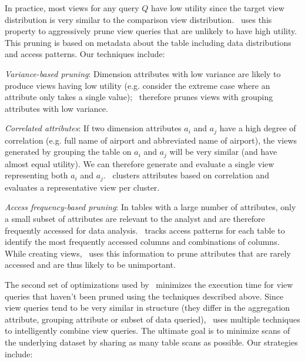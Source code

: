 
In practice, most views for any query $Q$ have low utility since the target view
distribution is very similar to the comparison view distribution. 
\VizRecDB\ uses this property to aggressively prune 
view queries that are unlikely to have high utility. 
This pruning is based on metadata about the table including data
distributions and access patterns. Our techniques include:
\begin{denselist}
\item {\it Variance-based pruning}: Dimension attributes with low variance are
likely to produce views having low utility (e.g. consider the extreme case where
an attribute only takes a single value); \VizRecDB\ therefore prunes views
with grouping attributes with low variance.
\item {\it Correlated attributes}: If two dimension attributes $a_i$ and $a_j$ have
a high degree of correlation (e.g. full name of airport and abbreviated name of
airport), the views generated by grouping the table on $a_i$ and $a_j$ will be
very similar (and have almost equal utility). We can therefore generate and
evaluate a single view representing both $a_i$ and $a_j$. \VizRecDB\ clusters
attributes based on correlation and evaluates a representative view per
cluster.
\item {\it Access frequency-based pruning}: In tables with a large number of
attributes, only a small subset of attributes are relevant to the analyst and
are therefore frequently accessed for data analysis. \VizRecDB\ tracks access patterns
for each table to identify the most frequently accessed columns and combinations of
columns. While creating views, \VizRecDB\ uses this information to prune attributes
that are rarely accessed and are thus likely to be unimportant.
\end{denselist}

The second set of optimizations used by \VizRecDB\ minimizes the execution time for
view queries that haven't been pruned using the techniques described above.
Since view queries tend to be very similar in structure (they differ in the aggregation
attribute, grouping attribute or subset of data queried), \VizRecDB\ uses multiple
techniques to intelligently combine view queries.
The ultimate goal is to minimize scans of the underlying dataset by sharing as
many table scans as possible. Our strategies include:

